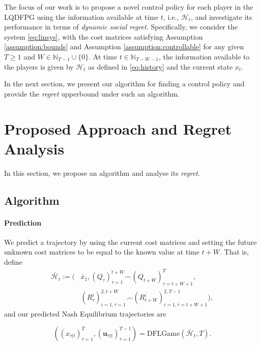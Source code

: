 \documentclass[letterpaper, 10 pt, conference]{ieeeconf}  %
\begin{document}
The focus of our work is to propose a novel control policy for each player in the LQDFPG using the information available at time $t$, i.e., $\mathcal{H}_{t}$, and investigate its performance in terms of \emph{dynamic social regret}. 
Specifically, we consider the system \eqref{eq:linsys}, with the cost matrices satisfying Assumption \ref{assumption:bounds} and Assumption \ref{assumption:controllable} for any given $T \geq 1$ and $W \in \mathbb{N}_{T-1}\cup \{0\}$. At time $t \in \mathbb{N}_{T-W-1}$, the information available to the players is given by $\mathcal{H}_{t}$ as defined in \eqref{eq:history} and the current state $x_{t}$.

In the next section, we present our algorithm for finding a control policy and provide the \emph{regret} upperbound under such an algorithm.

\section{Proposed Approach and Regret Analysis}\label{sec:approach}
In this section, we propose an algorithm and analyse its \emph{regret}.

\subsection{Algorithm}
\paragraph{Prediction} 

We predict a trajectory by using the current cost matrices and setting the future unknown cost matrices to be equal to the known value at time $t+W$. That is, define 
\begin{equation*}
\begin{split}
    \bar{\mathcal{H}}_{t} := (&\bar{x}_{1}, (Q_{\tau})_{\tau=1}^{t+W} \frown(Q_{t+W})_{\tau=t+W+1}^{T},\\
    &(R_{\tau}^{i})_{i=1,\tau=1}^{2,t+W} \frown(R_{t+W}^{i})_{i=1,\tau=t+W+1}^{2,T-1}),
\end{split}
\end{equation*}
and our predicted Nash Equilibrium trajectories are

\begin{equation*}
    ((x_{\tau|t})_{\tau=1}^{T},(\mathbf{u}_{\tau|t})_{\tau=1}^{T-1}) = \text{DFLGame}(\bar{\mathcal{H}}_{t},T).
\end{equation*}
\end{document}
